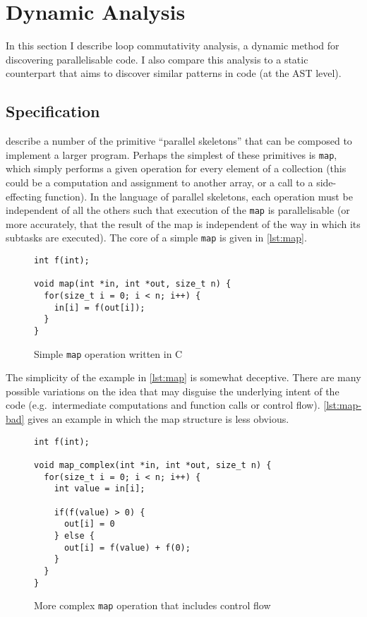 \documentclass[journal]{IEEEtran}
\begin{document}
\section{Dynamic Analysis} \label{sec:dynamic}

In this section I describe loop commutativity analysis, a dynamic method for
discovering parallelisable code. I also compare this analysis to a static
counterpart that aims to discover similar patterns in code (at the AST level).

\subsection{Specification} \label{ssec:spec}

\textcite{darlington_parallel_1995} describe a number of the primitive
``parallel skeletons'' that can be composed to implement a larger program.
Perhaps the simplest of these primitives is \texttt{map}, which simply performs
a given operation for every element of a collection (this could be a computation
and assignment to another array, or a call to a side-effecting function). In the
language of parallel skeletons, each operation must be independent of all the
others such that execution of the \texttt{map} is parallelisable (or more
accurately, that the result of the map is independent of the way in which its
subtasks are executed). The core of a simple \texttt{map} is given in
\autoref{lst:map}.

\begin{figure}[h]
  \centering
  \begin{lstlisting}
int f(int);

void map(int *in, int *out, size_t n) {
  for(size_t i = 0; i < n; i++) {
    in[i] = f(out[i]);
  }
}
  \end{lstlisting}
  \caption{Simple \texttt{map} operation written in C}
  \label{lst:map}
\end{figure}

The simplicity of the example in \autoref{lst:map} is somewhat deceptive. There
are many possible variations on the idea that may disguise the underlying intent
of the code (e.g.\ intermediate computations and function calls or control
flow). \autoref{lst:map-bad} gives an example in which the map structure is less
obvious. 

\begin{figure}[h]
  \centering
  \begin{lstlisting}
int f(int);

void map_complex(int *in, int *out, size_t n) {
  for(size_t i = 0; i < n; i++) {
    int value = in[i];

    if(f(value) > 0) {
      out[i] = 0
    } else {
      out[i] = f(value) + f(0);
    }
  }
}
  \end{lstlisting}
  \caption{More complex \texttt{map} operation that includes control flow}
  \label{lst:map-bad}
\end{figure}
\end{document}
